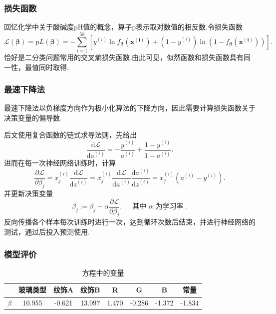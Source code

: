 \subsubsection{损失函数}

回忆化学中关于酸碱度pH值的概念，算子p表示取对数值的相反数.令损失函数
\begin{equation}
	\mathcal{L} (\boldsymbol{\beta}) = \mathrm{p} \textit{L$(\boldsymbol{\beta})$}
   = - \sum_{i = 1}^{58} [y^{(i)} \ln f_{\boldsymbol{\beta}}
   (\boldsymbol{x^{(i)}}) + (1 - y^{(i)}) \ln (1 - f_{\boldsymbol{\beta}}
   (\boldsymbol{x^{(i)}}))].
\end{equation}
恰好是二分类问题常用的交叉熵损失函数.由此可见，似然函数和损失函数具有同一性，最值同时取得.

\subsubsection{最速下降法}

最速下降法以负梯度方向作为极小化算法的下降方向，因此需要计算损失函数关于决策变量的偏导数.

后文使用复合函数的链式求导法则，先给出
\begin{equation}
	\frac{\mathrm{d} \mathcal{L}}{\mathrm{d} a^{(i)}} = -
   \frac{y^{(i)}}{a^{(i)}} + \frac{1 - y^{(i)}}{1 - a^{(i)}}.
\end{equation}
进而在每一次神经网络训练时，计算
\begin{equation}
	\frac{\partial \mathcal{L}}{\partial \beta_j} = x^{(i)}_j \frac{\mathrm{d}
   \mathcal{L}}{\mathrm{d}z^{(i)}} = x^{(i)}_j \frac{\mathrm{d}
   \mathcal{L}}{\mathrm{d} a^{(i)}} \frac{\mathrm{d} a^{(i)}}{\mathrm{d}z^{(i)}}
   = x^{(i)}_j (a^{(i)} - y^{(i)}).
\end{equation}
并更新决策变量
\begin{equation}
	\beta_{j}:=\beta_{j}-\alpha \frac{\partial \mathcal{L}}{\partial \beta_{j}}, \quad \text { 其中 } \alpha \text { 为学习率 }.
\end{equation}
反向传播各个样本每次训练时进行一次，达到循环次数后结束，并进行神经网络的测试，通过后投入预测使用.

\subsubsection{模型评价} %
\label{ssub:模型评价}

\begin{table}[!htp]
\setlength{\tabcolsep}{4mm}
\centering
\caption{方程中的变量}
\begin{tabular}{cccccccc}
\toprule
                            & 玻璃类型   & 纹饰A    & 纹饰B    & R     & G      & B      & 常量      \\
\midrule
\multicolumn{1}{l}{$\beta$} & 10.955 & -0.621 & 13.097 & 1.470 & -0.286 & -1.372 & -1.834  \\
\bottomrule
\end{tabular}
\end{table}


